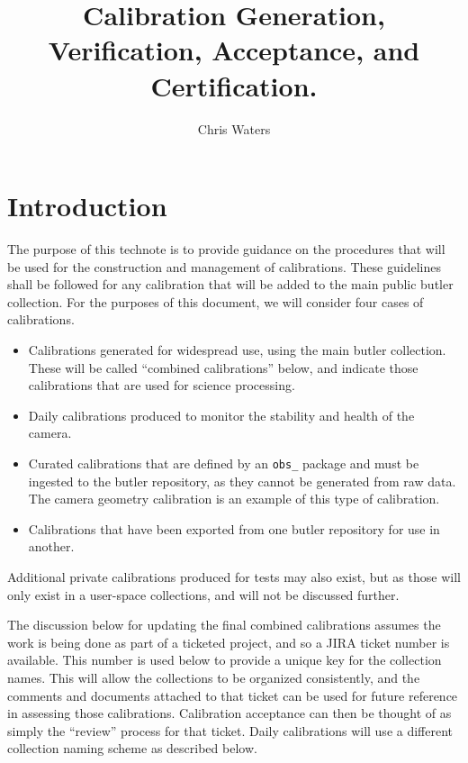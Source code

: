 \documentclass[DM,authoryear,toc]{lsstdoc}
\title{Calibration Generation, Verification, Acceptance, and Certification.}
\author{%
Chris Waters
}
\date{\vcsDate}
\begin{document}
\maketitle


\section{Introduction}

The purpose of this technote is to provide guidance on the procedures that will be used for the construction and management of calibrations.  These guidelines shall be followed for any calibration that will be added to the main public butler collection.  For the purposes of this document, we will consider four cases of calibrations.

\begin{itemize}
\item Calibrations generated for widespread use, using the main butler collection.  These will be called ``combined calibrations'' below, and indicate those calibrations that are used for science processing.
\item Daily calibrations produced to monitor the stability and health of the camera.
\item Curated calibrations that are defined by an \verb|obs_| package and must be ingested to the butler repository, as they cannot be generated from raw data.  The camera geometry calibration is an example of this type of calibration.
\item Calibrations that have been exported from one butler repository for use in another.
\end{itemize}

Additional private calibrations produced for tests may also exist, but as those will only exist in a user-space collections, and will not be discussed further.

The discussion below for updating the final combined calibrations assumes the work is being done as part of a ticketed project, and so a JIRA ticket number is available.  This number is used below to provide a unique key for the collection names.  This will allow the collections to be organized consistently, and the comments and documents attached to that ticket can be used for future reference in assessing those calibrations.  Calibration acceptance can then be thought of as simply the ``review'' process for that ticket.  Daily calibrations will use a different collection naming scheme as described below.
\end{document}
